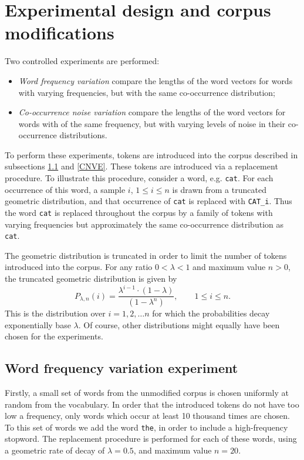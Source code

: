 \documentclass{article} %
\newcommand{\word}[1]{\texttt{#1}}
\begin{document}
\section{Experimental design and corpus modifications}\label{experimental_design}
Two controlled experiments are performed:
\begin{itemize}
	\item \emph{Word frequency variation} compare the lengths of the word vectors for words with varying frequencies, but with the same co-occurrence distribution;
	\item \emph{Co-occurrence noise variation} compare the lengths of the word vectors for words with of the same frequency, but with varying levels of noise in their co-occurrence distributions.
\end{itemize}

To perform these experiments, tokens are introduced into the corpus described in subsections \ref{WFVE} and \ref{CNVE}.
These tokens are introduced via a replacement procedure.
To illustrate this procedure, consider a word, e.g. \word{cat}.
For each occurrence of this word, a sample $i$, $1 \leqslant i \leqslant n$ is drawn from a truncated geometric distribution, and that occurrence of \word{cat} is replaced with \word{CAT\_i}.
Thus the word \word{cat} is replaced throughout the corpus by a family of tokens with varying frequencies but approximately the same co-occurrence distribution as \word{cat}.

The geometric distribution is truncated in order to limit the number of tokens introduced into the corpus.
For any ratio $0 < \lambda < 1$ and maximum value $n > 0$, the truncated geometric distribution is given by
$$ P_{\lambda, n} (i) = \frac{\lambda^{i-1} \cdot (1-\lambda)}{(1 - \lambda^n)}, \qquad 1 \leqslant i \leqslant n.$$ 
This is the distribution over $i = 1, 2, \dots n$ for which the probabilities decay exponentially base $\lambda$.
Of course, other distributions might equally have been chosen for the experiments.

\subsection{Word frequency variation experiment}\label{WFVE}
Firstly, a small set of words from the unmodified corpus is chosen uniformly at random from the vocabulary.
In order that the introduced tokens do not have too low a frequency, only words which occur at least 10 thousand times are chosen.
To this set of words we add the word \word{the}, in order to include a high-frequency stopword.
The replacement procedure is performed for each of these words, using a geometric rate of decay of $\lambda = 0.5$, and maximum value $n=20$.
\end{document}

